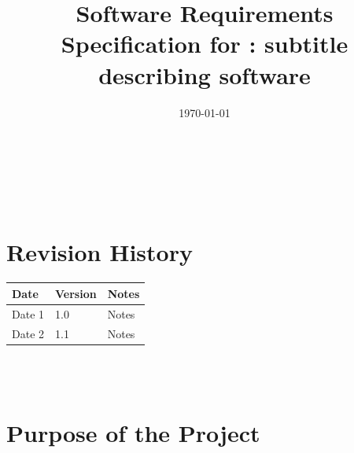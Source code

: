 \documentclass[12pt]{article}
\begin{document}
\title{Software Requirements Specification for \progname: subtitle describing software} 
\author{\authname}
\date{\today}
	
\maketitle

~\newpage


\tableofcontents

~\newpage

\section*{Revision History}

\begin{tabularx}{\textwidth}{p{3cm}p{2cm}X}
\toprule {\textbf{Date}} & {\textbf{Version}} & {\textbf{Notes}}\\
\midrule
Date 1 & 1.0 & Notes\\
Date 2 & 1.1 & Notes\\
\bottomrule
\end{tabularx}

~\\

~\newpage
\section{Purpose of the Project}
\end{document}
